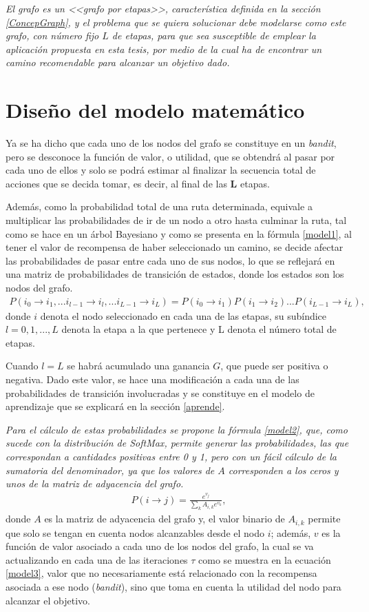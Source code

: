 \textit{El grafo es un <<grafo por etapas>>, característica definida en la sección \ref{ConcepGraph}, y el problema que se quiera solucionar debe modelarse como este grafo, con número fijo $L$ de etapas, para que sea susceptible de emplear la aplicación propuesta en esta tesis, por medio de la cual ha de encontrar un camino recomendable para alcanzar un objetivo dado.}

\section{Diseño del modelo matemático}
\label{mat}
Ya se ha dicho que cada uno de los nodos del grafo se constituye en un \textit{ bandit}, pero se desconoce la función de valor, o utilidad, que se obtendrá al pasar por cada uno de ellos y solo se podrá estimar al finalizar la secuencia total de acciones que se decida tomar, es decir, al final de las \textbf{L} etapas.

Además, como la probabilidad total de una ruta determinada, equivale a multiplicar las probabilidades de ir de un nodo a otro hasta culminar la ruta, tal como se hace en un árbol Bayesiano y como se presenta en la fórmula \ref{model1}, al tener el valor de recompensa de haber seleccionado un camino, se decide afectar las probabilidades de pasar entre cada uno de sus nodos, lo que se reflejará en una matriz de probabilidades de transición de estados, donde los estados son los nodos del grafo.
\begin{eqnarray}\label{model1}
P(i_{0} \to i_{1}, ... i_{l-1} \to i_{l}, ... i_{L-1} \to i_{L})=P(i_{0} \to i_{1})P(i_{1} \to i_{2})...P(i_{L-1} \to i_{L}),
\end{eqnarray}
donde $i$ denota el nodo seleccionado en cada una de las etapas, su subíndice $l=0,1,...,L$ denota la etapa a la que pertenece y L denota el número total de etapas. 

Cuando $l = L$ se habrá acumulado una ganancia $G$, que puede ser positiva o negativa. Dado este valor, se hace una modificación a cada una de las probabilidades de transición involucradas y se constituye en el modelo de aprendizaje que se explicará en la sección \ref{aprende}.

\textit{Para el cálculo de estas probabilidades se propone la fórmula \ref{model2}, que, como sucede con la distribución de \textit{SoftMax}, permite generar las probabilidades, las que correspondan a cantidades positivas entre 0 y 1, pero con un fácil cálculo de la sumatoria del denominador, ya que los valores de $A$ corresponden a los ceros y unos de la matriz de adyacencia del grafo.}
\begin{eqnarray}\label{model2}
P(i \to j) = \frac{e^{v_j}}{\sum_k A_{i,k} e^{v_k}},
\end{eqnarray}
donde $A$ es la matriz de adyacencia del grafo y, el valor binario de $A_{i,k}$ permite que solo se tengan en cuenta nodos alcanzables desde el nodo $i$; además, $v$ es la función de valor asociado a cada uno de los nodos del grafo, la cual se va actualizando en cada una de las iteraciones $\tau$ como se muestra en la ecuación \ref{model3}, valor que no necesariamente está relacionado con la recompensa asociada a ese nodo (\textit{bandit}), sino que toma en cuenta la utilidad del nodo para alcanzar el objetivo.

